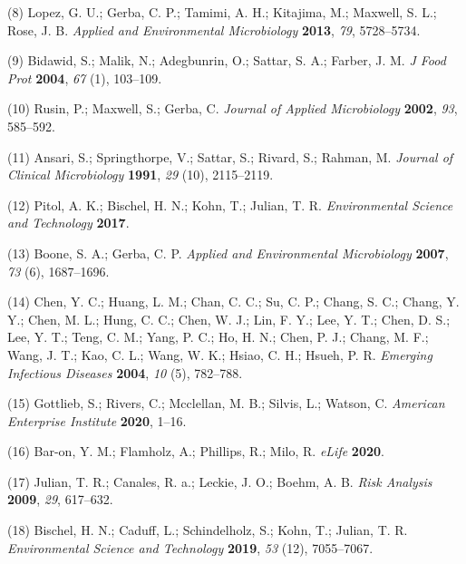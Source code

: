 \documentclass[journal=jacsat,manuscript=article]{achemso}
\begin{document}
\leavevmode\hypertarget{ref-Lopez2013}{}%
(8) Lopez, G. U.; Gerba, C. P.; Tamimi, A. H.; Kitajima, M.; Maxwell, S.
L.; Rose, J. B. \emph{Applied and Environmental Microbiology}
\textbf{2013}, \emph{79}, 5728--5734.

\leavevmode\hypertarget{ref-Bidawid2004}{}%
(9) Bidawid, S.; Malik, N.; Adegbunrin, O.; Sattar, S. A.; Farber, J. M.
\emph{J Food Prot} \textbf{2004}, \emph{67} (1), 103--109.

\leavevmode\hypertarget{ref-Rusin2002}{}%
(10) Rusin, P.; Maxwell, S.; Gerba, C. \emph{Journal of Applied
Microbiology} \textbf{2002}, \emph{93}, 585--592.

\leavevmode\hypertarget{ref-Ansari1991}{}%
(11) Ansari, S.; Springthorpe, V.; Sattar, S.; Rivard, S.; Rahman, M.
\emph{Journal of Clinical Microbiology} \textbf{1991}, \emph{29} (10),
2115--2119.

\leavevmode\hypertarget{ref-Pitol2017}{}%
(12) Pitol, A. K.; Bischel, H. N.; Kohn, T.; Julian, T. R.
\emph{Environmental Science and Technology} \textbf{2017}.

\leavevmode\hypertarget{ref-Boone2007}{}%
(13) Boone, S. A.; Gerba, C. P. \emph{Applied and Environmental
Microbiology} \textbf{2007}, \emph{73} (6), 1687--1696.

\leavevmode\hypertarget{ref-Chen2004}{}%
(14) Chen, Y. C.; Huang, L. M.; Chan, C. C.; Su, C. P.; Chang, S. C.;
Chang, Y. Y.; Chen, M. L.; Hung, C. C.; Chen, W. J.; Lin, F. Y.; Lee, Y.
T.; Chen, D. S.; Lee, Y. T.; Teng, C. M.; Yang, P. C.; Ho, H. N.; Chen,
P. J.; Chang, M. F.; Wang, J. T.; Kao, C. L.; Wang, W. K.; Hsiao, C. H.;
Hsueh, P. R. \emph{Emerging Infectious Diseases} \textbf{2004},
\emph{10} (5), 782--788.

\leavevmode\hypertarget{ref-Mcclellan2020}{}%
(15) Gottlieb, S.; Rivers, C.; Mcclellan, M. B.; Silvis, L.; Watson, C.
\emph{American Enterprise Institute} \textbf{2020}, 1--16.

\leavevmode\hypertarget{ref-BarOn2020}{}%
(16) Bar-on, Y. M.; Flamholz, A.; Phillips, R.; Milo, R. \emph{eLife}
\textbf{2020}.

\leavevmode\hypertarget{ref-Julian2009}{}%
(17) Julian, T. R.; Canales, R. a.; Leckie, J. O.; Boehm, A. B.
\emph{Risk Analysis} \textbf{2009}, \emph{29}, 617--632.

\leavevmode\hypertarget{ref-Bischel2019}{}%
(18) Bischel, H. N.; Caduff, L.; Schindelholz, S.; Kohn, T.; Julian, T.
R. \emph{Environmental Science and Technology} \textbf{2019}, \emph{53}
(12), 7055--7067.
\end{document}
